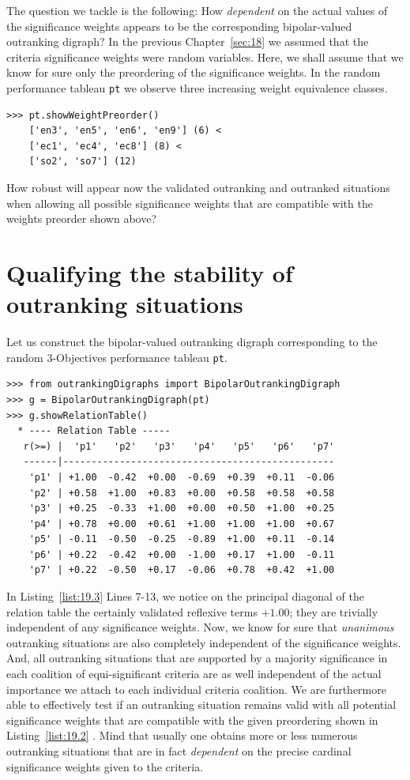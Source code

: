The question we tackle is the following: How \emph{dependent} on the actual values of the significance weights appears to be the corresponding bipolar-valued outranking digraph? In the previous Chapter~\ref{sec:18} we assumed that the criteria significance weights were random variables. Here, we shall assume that we know for sure only the preordering of the significance weights. In the random performance tableau \texttt{pt} we observe three increasing weight equivalence classes.
\begin{lstlisting}[caption={The significance weights preorder},label=list:19.2]
>>> pt.showWeightPreorder()
    ['en3', 'en5', 'en6', 'en9'] (6) <
    ['ec1', 'ec4', 'ec8'] (8) <
    ['so2', 'so7'] (12)
\end{lstlisting}

How robust will appear now the validated outranking and outranked situations when allowing all possible significance weights that are compatible with the weights preorder shown above?

\section{Qualifying the stability of outranking situations}
\label{sec:19.2}

Let us construct the bipolar-valued outranking digraph corresponding to the random 3-Objectives performance tableau \texttt{pt}.
\begin{lstlisting}[caption={Example Bipolar Outranking Digraph},label=list:19.3]
>>> from outrankingDigraphs import BipolarOutrankingDigraph
>>> g = BipolarOutrankingDigraph(pt)
>>> g.showRelationTable()
  * ---- Relation Table -----
   r(>=) |  'p1'   'p2'   'p3'   'p4'   'p5'   'p6'   'p7'   
   ------|------------------------------------------------
    'p1' | +1.00  -0.42  +0.00  -0.69  +0.39  +0.11  -0.06  
    'p2' | +0.58  +1.00  +0.83  +0.00  +0.58  +0.58  +0.58  
    'p3' | +0.25  -0.33  +1.00  +0.00  +0.50  +1.00  +0.25  
    'p4' | +0.78  +0.00  +0.61  +1.00  +1.00  +1.00  +0.67  
    'p5' | -0.11  -0.50  -0.25  -0.89  +1.00  +0.11  -0.14  
    'p6' | +0.22  -0.42  +0.00  -1.00  +0.17  +1.00  -0.11  
    'p7' | +0.22  -0.50  +0.17  -0.06  +0.78  +0.42  +1.00  
\end{lstlisting}

In Listing~\vref{list:19.3} Lines 7-13, we notice on the principal diagonal of the relation table the certainly validated reflexive terms $+1.00$; they are trivially independent of any significance weights. Now, we know for sure that \emph{unanimous} outranking situations are also completely independent of the significance weights. And, all outranking situations that are supported by a majority significance in each coalition of equi-significant criteria are as well independent of the actual importance we attach to each individual criteria coalition. We are furthermore able to effectively test if an outranking situation remains valid with all potential significance weights that are compatible with the given preordering shown in Listing~\vref{list:19.2} \citep{BIS-2014}. Mind that usually one obtains more or less numerous outranking situations that are in fact \emph{dependent} on the precise cardinal significance weights given to the criteria.

